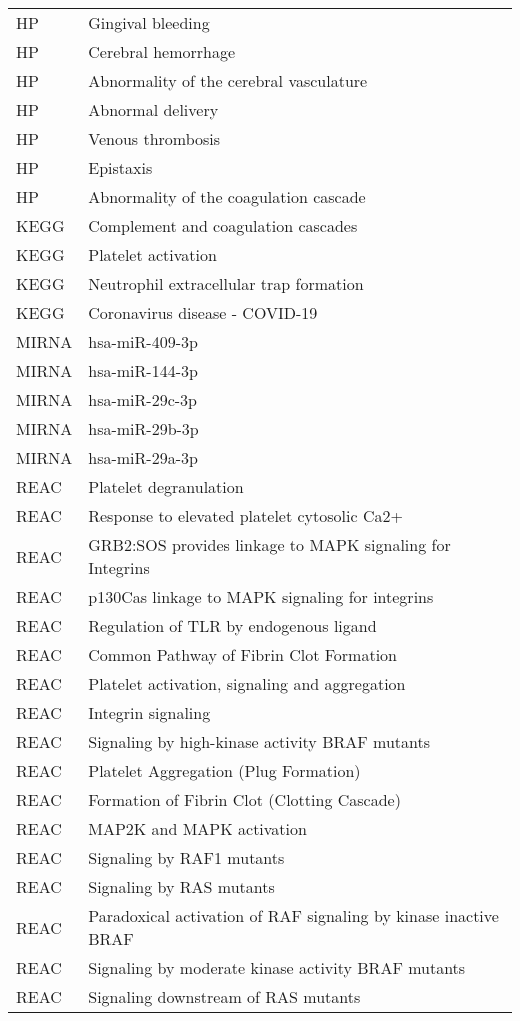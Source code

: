 \begin{longtable}{lp{12cm}}
HP & Gingival bleeding\\
HP & Cerebral hemorrhage\\
HP & Abnormality of the cerebral vasculature\\
HP & Abnormal delivery\\
HP & Venous thrombosis\\
HP & Epistaxis\\
HP & Abnormality of the coagulation cascade\\
KEGG & Complement and coagulation cascades\\
KEGG & Platelet activation\\
KEGG & Neutrophil extracellular trap formation\\
KEGG & Coronavirus disease - COVID-19\\
MIRNA & hsa-miR-409-3p\\
MIRNA & hsa-miR-144-3p\\
MIRNA & hsa-miR-29c-3p\\
MIRNA & hsa-miR-29b-3p\\
MIRNA & hsa-miR-29a-3p\\
REAC & Platelet degranulation\\
REAC & Response to elevated platelet cytosolic Ca2+\\
REAC & GRB2:SOS provides linkage to MAPK signaling for Integrins\\
REAC & p130Cas linkage to MAPK signaling for integrins\\
REAC & Regulation of TLR by endogenous ligand\\
REAC & Common Pathway of Fibrin Clot Formation\\
REAC & Platelet activation, signaling and aggregation\\
REAC & Integrin signaling\\
REAC & Signaling by high-kinase activity BRAF mutants\\
REAC & Platelet Aggregation (Plug Formation)\\
REAC & Formation of Fibrin Clot (Clotting Cascade)\\
REAC & MAP2K and MAPK activation\\
REAC & Signaling by RAF1 mutants\\
REAC & Signaling by RAS mutants\\
REAC & Paradoxical activation of RAF signaling by kinase inactive BRAF\\
REAC & Signaling by moderate kinase activity BRAF mutants\\
REAC & Signaling downstream of RAS mutants\\

\end{longtable}
